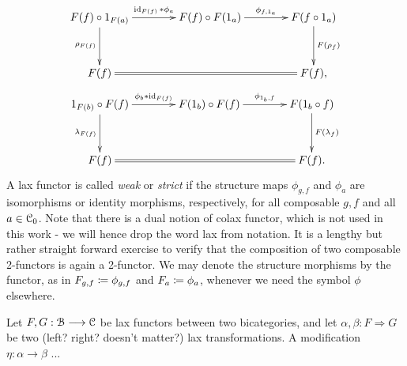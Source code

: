 \begin{defn}
    \begin{gather*}
      \xymatrix@C+1.5em@R+1em{
        F(f) \circ 1_{F(a)}
          \ar[r]^-{\id_{F(f)} \ast \phi_a}
          \ar[d]_{\rho_{F(f)}}
        &
        F(f) \circ F(1_a)
          \ar[r]^-{\phi_{f,1_a}}
        &
        F(f \circ 1_a)
          \ar[d]^{F(\rho_f)}
        \\
        F(f)
          \ar@{=}[rr]
        &
        &
        F(f),
      }
    \end{gather*}
    \begin{gather*}
      \xymatrix@C+1.5em@R+1em{
        1_{F(b)} \circ F(f)
          \ar[r]^-{\phi_b \ast \id_{F(f)}}
          \ar[d]_{\lambda_{F(f)}}
        &
        F(1_b) \circ F(f)
          \ar[r]^-{\phi_{1_b,f}}
        &
        F(1_b \circ f)
          \ar[d]^{F(\lambda_f)}
        \\
        F(f)
          \ar@{=}[rr]
        &
        &
        F(f).
       }
    \end{gather*}
    A lax functor is called \emph{weak} or \emph{strict} if the structure maps
    $\phi_{g,f}$ and $\phi_a$ are isomorphisms or identity morphisms,
    respectively, for all composable $g,f$ and all $a \in \mathcal{C}_0$. 
    Note that there is a dual notion of colax functor, which is not used in this
    work - we will hence drop the word lax from notation. 
    It is a lengthy but rather straight forward exercise to verify that the
    composition of two composable 2-functors is again a 2-functor. 
    We may denote the structure morphisms by the functor, as in $F_{g,f} \coloneqq
    \phi_{g,f}$ and $F_a \coloneqq \phi_a$, whenever we need the symbol $\phi$
    elsewhere.
  \end{defn}

  \begin{defn}\label{def_modification}
  Let $F,G: \mathcal{B} \longrightarrow \mathcal{C}$ be lax functors between two bicategories, and let $\alpha,\beta: F \Rightarrow G$ be two (left? right? doesn't matter?) lax transformations. A modification $\eta: \alpha \to \beta$ ...
  \end{defn}

